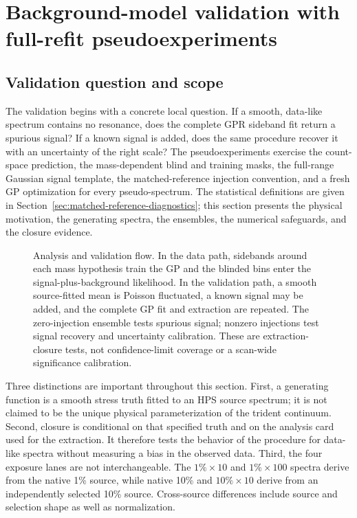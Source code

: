 
\section{Background-model validation with full-refit pseudoexperiments}
\label{sec:toys}

\subsection{Validation question and scope}

The validation begins with a concrete local question.  If a smooth, data-like spectrum
contains no resonance, does the complete GPR sideband fit return a spurious signal?
If a known signal is added, does the same procedure recover it with an uncertainty of
the right scale?  The pseudoexperiments exercise the count-space prediction,
the mass-dependent blind and training masks, the full-range Gaussian signal
template, the matched-reference injection convention, and a fresh GP optimization
for every pseudo-spectrum.  The statistical definitions are given in
Section~\ref{sec:matched-reference-diagnostics}; this section presents the physical
motivation, the generating spectra, the ensembles, the numerical safeguards, and
the closure evidence.

\begin{figure}[htbp]
\centering
{}
\caption{Analysis and validation flow.  In the data path, sidebands around each mass
hypothesis train the GP and the blinded bins enter the signal-plus-background
likelihood.  In the validation path, a smooth source-fitted mean is Poisson
fluctuated, a known signal may be added, and the complete GP fit and extraction are
repeated.  The zero-injection ensemble tests spurious signal; nonzero injections test
signal recovery and uncertainty calibration.  These are extraction-closure tests,
not confidence-limit coverage or a scan-wide significance calibration.}
\label{fig:v491-hps-gpr-flowchart}
\end{figure}

Three distinctions are important throughout this section.  First, a generating
function is a smooth stress truth fitted to an HPS source spectrum; it is not claimed
to be the unique physical parameterization of the trident continuum.  Second,
closure is conditional on that specified truth and on the analysis card used for the
extraction.  It therefore tests the behavior of the procedure for data-like spectra
without measuring a bias in the observed data.  Third, the four exposure lanes are
not interchangeable.  The $1\%\times10$ and $1\%\times100$ spectra derive from the
native 1\% source, while native 10\% and $10\%\times10$ derive from an independently
selected 10\% source.  Cross-source differences include source and selection shape
as well as normalization.

